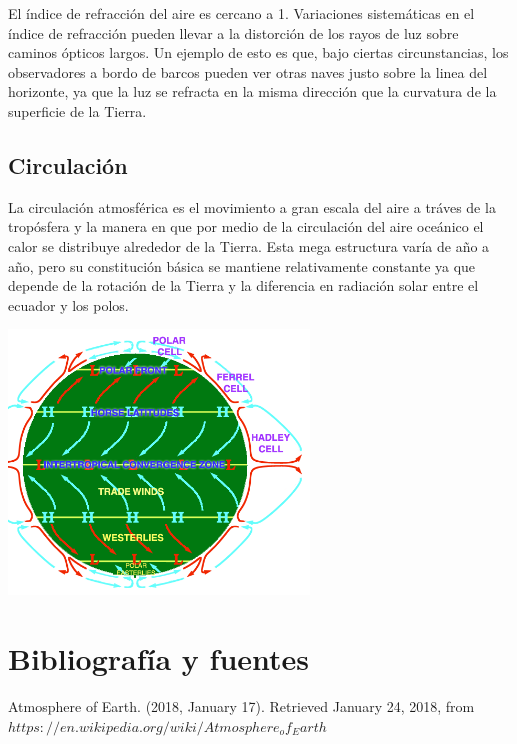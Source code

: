\documentclass{article} %
\begin{document}
El índice de refracción del aire es cercano a 1. Variaciones sistemáticas en el índice de refracción pueden llevar a la distorción de los rayos de luz sobre caminos ópticos largos. Un ejemplo de esto es que, bajo ciertas circunstancias, los observadores a bordo de barcos pueden ver otras naves justo sobre la linea del horizonte, ya que la luz se refracta en la misma dirección que la curvatura de la superficie de la Tierra. 

\subsection{Circulación}

La circulación atmosférica es el movimiento a gran escala del aire a tráves de la tropósfera y la manera en que por medio de la circulación del aire oceánico el calor se distribuye alrededor de la Tierra. Esta mega estructura varía de año a año, pero su constitución básica se mantiene relativamente constante ya que depende de la rotación de la Tierra y la diferencia en radiación solar entre el ecuador y los polos. 
\vspace{0.5 cm}

\begin{center}

\includegraphics[width=8cm]{AtmosphCirc2.png}    
    
\end{center}

\vspace{5cm}

\section*{Bibliografía y fuentes}

Atmosphere of Earth. (2018, January 17). Retrieved January 24, 2018, from $https://en.wikipedia.org/wiki/Atmosphere_of_Earth$
\end{document}
